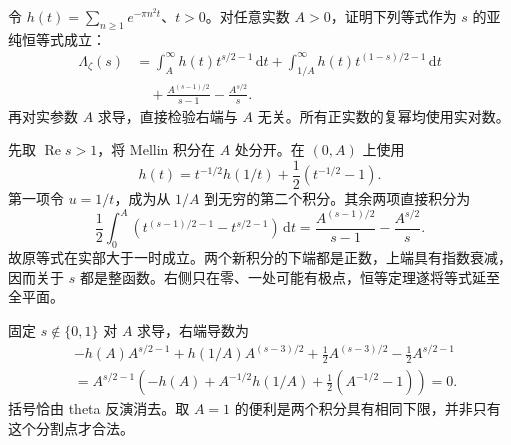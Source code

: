 \begin{exercise}\label{b3:ex:26-3}
令 \(h(t)=\sum_{n\ge1}e^{-\pi n^2t}\)、\(t>0\)。对任意实数 \(A>0\)，证明下列等式作为 \(s\) 的亚纯恒等式成立：
\[
 \begin{aligned}
 \Lambda_\zeta(s)
 &=\int_A^\infty h(t)t^{s/2-1}\,\mathrm dt
   +\int_{1/A}^\infty h(t)t^{(1-s)/2-1}\,\mathrm dt\\
 &\quad+\frac{A^{(s-1)/2}}{s-1}-\frac{A^{s/2}}s.
 \end{aligned}
\]
再对实参数 \(A\) 求导，直接检验右端与 \(A\) 无关。所有正实数的复幂均使用实对数。
\end{exercise}
\begin{solution}
先取 \(\operatorname{Re}s>1\)，将 Mellin 积分在 \(A\) 处分开。在 \((0,A)\) 上使用
\[
 h(t)=t^{-1/2}h(1/t)+\frac12(t^{-1/2}-1).
\]
第一项令 \(u=1/t\)，成为从 \(1/A\) 到无穷的第二个积分。其余两项直接积分为
\[
 \frac12\int_0^A
       \left(t^{(s-1)/2-1}-t^{s/2-1}\right)\,\mathrm dt
 =\frac{A^{(s-1)/2}}{s-1}-\frac{A^{s/2}}s.
\]
故原等式在实部大于一时成立。两个新积分的下端都是正数，上端具有指数衰减，因而关于 \(s\) 都是整函数。右侧只在零、一处可能有极点，恒等定理遂将等式延至全平面。

固定 \(s\notin\{0,1\}\) 对 \(A\) 求导，右端导数为
\[
 \begin{aligned}
 &-h(A)A^{s/2-1}
   +h(1/A)A^{(s-3)/2}
   +\frac12A^{(s-3)/2}-\frac12A^{s/2-1}\\
 &=A^{s/2-1}
   \left(-h(A)+A^{-1/2}h(1/A)+\frac12(A^{-1/2}-1)\right)=0.
 \end{aligned}
\]
括号恰由 theta 反演消去。取 \(A=1\) 的便利是两个积分具有相同下限，并非只有这个分割点才合法。
\end{solution}

